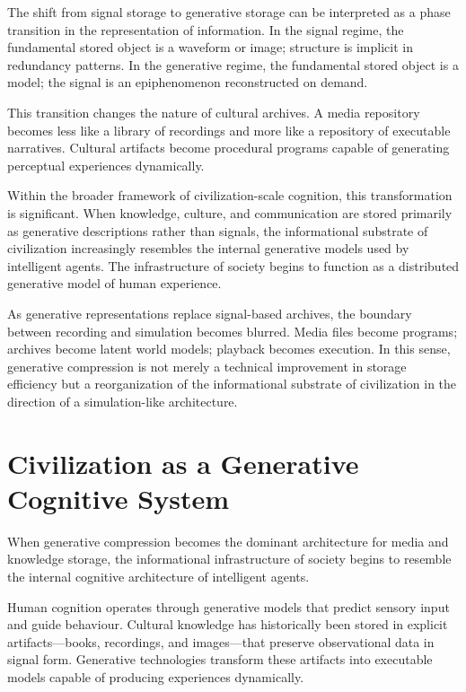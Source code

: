 \documentclass[12pt,a4paper]{article}
\theoremstyle{plain}
\theoremstyle{definition}
\begin{document}
The shift from signal storage to generative storage can be interpreted as a phase transition in the representation of information. In the signal regime, the fundamental stored object is a waveform or image; structure is implicit in redundancy patterns. In the generative regime, the fundamental stored object is a model; the signal is an epiphenomenon reconstructed on demand.

This transition changes the nature of cultural archives. A media repository becomes less like a library of recordings and more like a repository of executable narratives. Cultural artifacts become procedural programs capable of generating perceptual experiences dynamically.

Within the broader framework of civilization-scale cognition, this transformation is significant. When knowledge, culture, and communication are stored primarily as generative descriptions rather than signals, the informational substrate of civilization increasingly resembles the internal generative models used by intelligent agents. The infrastructure of society begins to function as a distributed generative model of human experience.

As generative representations replace signal-based archives, the boundary between recording and simulation becomes blurred. Media files become programs; archives become latent world models; playback becomes execution. In this sense, generative compression is not merely a technical improvement in storage efficiency but a reorganization of the informational substrate of civilization in the direction of a simulation-like architecture.

\section{Civilization as a Generative Cognitive System}
\label{sec:civilization}

When generative compression becomes the dominant architecture for media and knowledge storage, the informational infrastructure of society begins to resemble the internal cognitive architecture of intelligent agents.

Human cognition operates through generative models that predict sensory input and guide behaviour. Cultural knowledge has historically been stored in explicit artifacts—books, recordings, and images—that preserve observational data in signal form. Generative technologies transform these artifacts into executable models capable of producing experiences dynamically.
\end{document}
